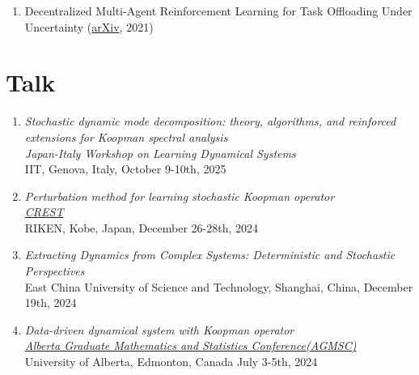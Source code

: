 \documentclass[margin]{res}
\begin{document}
\begin{resume}
\begin{enumerate}
    \item Decentralized Multi-Agent Reinforcement Learning for Task Offloading Under Uncertainty (\href{https://arxiv.org/abs/2107.08114}{arXiv}, 2021)


\end{enumerate}


\section{Talk}
\begin{enumerate}
    \item {\sl Stochastic dynamic mode decomposition: theory, algorithms, and reinforced extensions for Koopman spectral analysis} \\
    {\sl Japan-Italy Workshop on Learning Dynamical Systems} \\
    IIT, Genova, Italy, October 9-10th, 2025
    
    \item {\sl Perturbation method for learning stochastic Koopman operator} \\
    \href{https://docs.google.com/spreadsheets/d/1XrgG53J6HlsHYLRHtYFsj5s32eWDr9B_/edit?gid=1512777206#gid=1512777206}{\sl CREST} \\
    RIKEN, Kobe, Japan, December 26-28th, 2024

    \item {\sl Extracting Dynamics from Complex Systems: Deterministic and Stochastic Perspectives} \\
    East China University of Science and Technology, Shanghai, China, December 19th, 2024

    \item {\sl Data-driven dynamical system with Koopman operator} \\    \href{https://docs.google.com/document/d/1oWIKgW8W_qmmOJkUmXaJiKEmhW-mByOP0N44jT0jp18/edit#heading=h.dkxccm7x4lvd}{\sl Alberta Graduate Mathematics and Statistics Conference(AGMSC)} \\
    University of Alberta, Edmonton, Canada July 3-5th, 2024
\end{enumerate}




\end{resume}
\end{document}
